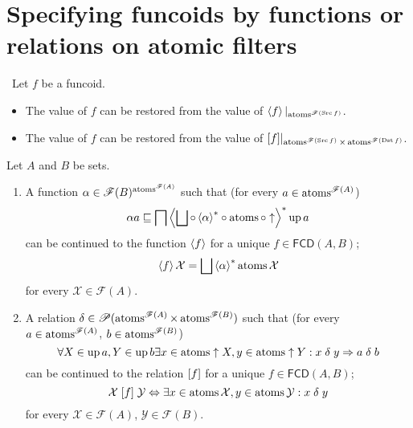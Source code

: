 
\section{Specifying funcoids by functions or relations on atomic filters}
\begin{cor}
~Let $f$ be a funcoid.
\begin{itemize}
\item The value of $f$ can be restored from the value of $\left\langle f\right\rangle|_{\operatorname{atoms}^{\mathscr{F}(\operatorname{Src} f)}}$.
\item The value of $f$ can be restored from the value of $\mathord{\mathrel{\left[f\right]}}|_{\operatorname{atoms}^{\mathscr{F}(\operatorname{Src} f)}\times\operatorname{atoms}^{\mathscr{F}(\operatorname{Dst} f)}}$.
\end{itemize}
\end{cor}
\begin{thm}
\label{cont-fcd-on-atoms}Let $A$ and $B$ be sets.
\begin{enumerate}
\item \label{at-restr-f}A function
$\alpha\in\mathscr{F}(B)^{\operatorname{atoms}^{\mathscr{F}(A)}}$
such that (for every $a\in\operatorname{atoms}^{\mathscr{F}(A)}$)
\begin{equation}
\alpha
a\sqsubseteq\bigsqcap\rsupfun{\bigsqcup\circ\rsupfun{\alpha}
\circ\atoms\circ\uparrow}\up a\label{at-func-cond}
\end{equation}
can be continued to the function $\left\langle f\right\rangle$ for a unique
$f\in\mathsf{FCD}(A,B)$;
\begin{equation}
\supfun
f\mathcal{X}=\bigsqcup\rsupfun{\alpha}\atoms\mathcal{X}\label{at-func-eq}
\end{equation}
for every $\mathcal{X}\in\mathscr{F}(A)$.

\item \label{at-restr-r}A relation
$\delta\in\mathscr{P}(\operatorname{atoms}^{\mathscr{F}(A)}\times\operatorname{atoms}^{\mathscr{F}(B)})$
such that (for every $a\in\operatorname{atoms}^{\mathscr{F}(A)}$,
$b\in\operatorname{atoms}^{\mathscr{F}(B)}$)
\begin{equation}
\forall X\in\operatorname{up} a,Y\in\operatorname{up} b\exists x\in\operatorname{atoms}\uparrow X,y\in\operatorname{atoms}\uparrow
Y:x\mathrel\delta y\Rightarrow a\mathrel\delta b\label{at-rel-cond}
\end{equation}
can be continued to the relation $\mathrel{\left[f\right]}$ for a unique
$f\in\mathsf{FCD}(A,B)$;
\begin{equation}
\mathcal{X}\mathrel{\left[f\right]}\mathcal{Y}\Leftrightarrow\exists
x\in\operatorname{atoms}\mathcal{X},y\in\operatorname{atoms}\mathcal{Y}:x\mathrel\delta y\label{at-rel-eq}
\end{equation}
for every $\mathcal{X}\in\mathscr{F}(A)$, $\mathcal{Y}\in\mathscr{F}(B)$.

\end{enumerate}
\end{thm}
